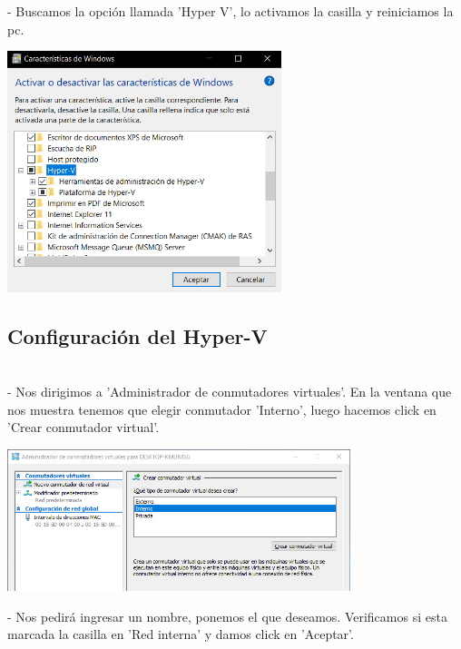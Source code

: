 \documentclass[12pt,letterpaper]{article}
\begin{document}
\begin{itemize}
- Buscamos la opción llamada 'Hyper V', lo activamos la casilla y reiniciamos la pc.\\
\end{itemize}

\begin{center}
	\includegraphics[width=8cm]{./Imagenes/2} 
\end{center}


\begin{itemize}
\subsection{Configuración del Hyper-V}\\
- Nos dirigimos a 'Administrador de conmutadores virtuales'. En la ventana que nos muestra
tenemos que elegir conmutador 'Interno', luego hacemos click en 'Crear conmutador virtual'.
\end{itemize}

\begin{center}
	\includegraphics[width=10cm]{./Imagenes/3} 
\end{center}


\begin{itemize}
- Nos pedirá ingresar un nombre, ponemos el que deseamos. Verificamos si esta marcada la casilla
en 'Red interna' y damos click en 'Aceptar'.\\
\end{itemize}
\end{document}
